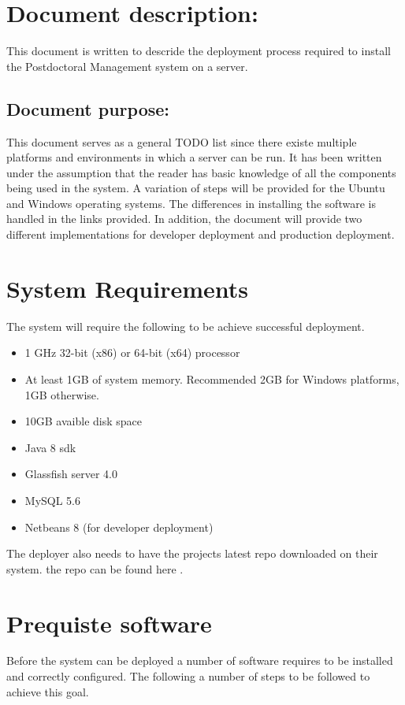 \documentclass[12pt]{article}
\begin{document}
\listoffigures
\newpage
\section{Document description:}
This document is written to descride the deployment process required to install the Postdoctoral Management system on a server.
\subsection{Document purpose:}
\vspace{0.2in}
This document serves as a general TODO list since there existe multiple platforms and environments in which a server can be run. It has been written under the assumption that the reader has basic knowledge of all the components being used in the system. A variation of steps will be provided for the Ubuntu and Windows operating systems. The differences in installing the software is handled in the links provided. In addition, the document will provide two different implementations for developer deployment and production deployment.
\vspace{0.2in}
\section{System Requirements}
The system will require the following to be achieve successful deployment.
\begin{itemize}
\item 1 GHz 32-bit (x86) or 64-bit (x64) processor
\item At least 1GB of system memory. Recommended 2GB for Windows platforms, 1GB otherwise.
\item 10GB avaible disk space
\item Java 8 sdk
\item Glassfish server 4.0
\item MySQL 5.6
\item Netbeans 8 (for developer deployment)
\end{itemize}
The deployer also needs to have the projects latest repo downloaded on their system. the repo can be found here \textbf{}.
\section{Prequiste software}
Before the system can be deployed a number of software requires to be installed and correctly configured. The following a number of steps to be followed to achieve this goal.
\end{document}
